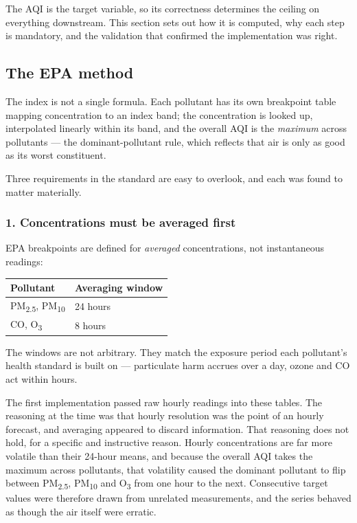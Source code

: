 \documentclass[11pt,a4paper]{article}
\begin{document}
The AQI is the target variable, so its correctness determines the
ceiling on everything downstream. This section sets out how it is
computed, why each step is mandatory, and the validation that confirmed
the implementation was right.

\subsection{The EPA method}

The index is not a single formula. Each pollutant has its own breakpoint
table mapping concentration to an index band; the concentration is
looked up, interpolated linearly within its band, and the overall AQI is
the \emph{maximum} across pollutants --- the dominant-pollutant rule,
which reflects that air is only as good as its worst constituent.

Three requirements in the standard are easy to overlook, and each was
found to matter materially.

\subsubsection*{1. Concentrations must be averaged first}

EPA breakpoints are defined for \emph{averaged} concentrations, not
instantaneous readings:

\begin{center}
\small
\begin{tabular}{ll}
\toprule
\textbf{Pollutant} & \textbf{Averaging window} \\
\midrule
PM\textsubscript{2.5}, PM\textsubscript{10} & 24 hours \\
CO, O\textsubscript{3} & 8 hours \\
\bottomrule
\end{tabular}
\end{center}

The windows are not arbitrary. They match the exposure period each
pollutant's health standard is built on --- particulate harm accrues
over a day, ozone and CO act within hours.

The first implementation passed raw hourly readings into these tables.
The reasoning at the time was that hourly resolution was the point of an
hourly forecast, and averaging appeared to discard information. That
reasoning does not hold, for a specific and instructive reason. Hourly
concentrations are far more volatile than their 24-hour means, and
because the overall AQI takes the maximum across pollutants, that
volatility caused the dominant pollutant to flip between
PM\textsubscript{2.5}, PM\textsubscript{10} and O\textsubscript{3} from
one hour to the next. Consecutive target values were therefore drawn
from unrelated measurements, and the series behaved as though the air
itself were erratic.
\end{document}
